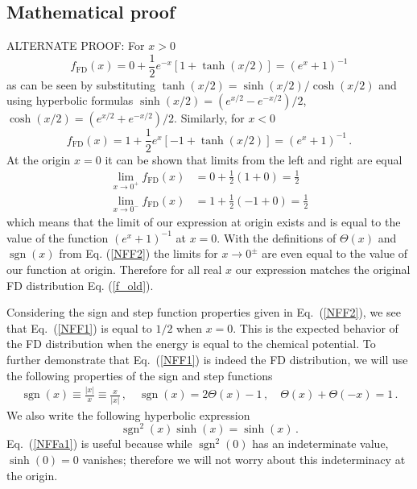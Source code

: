 \documentclass[sn-mathphys,Numbered]{sn-jnl}
\newcommand{\req}[1]{Eq.~(\ref{#1})}
\DeclareMathOperator{\sgn}{sgn}
\newcommand{\rev}[1]{{\color{blue}#1}}
\begin{document}
\subsection{Mathematical proof}
\label{Proof}
\rev{ALTERNATE PROOF:
For $x>0$
\begin{equation}
    f_\mathrm{FD}(x) = 0 + \frac{1}{2}e^{-x}[1+\tanh(x/2)] = (e^x + 1)^{-1}
\end{equation}
as can be seen by substituting $\tanh(x/2)=\sinh(x/2)/\cosh(x/2)$ and using hyperbolic formulas $\sinh(x/2)=(e^{x/2}-e^{-x/2})/2$, $\cosh(x/2) = (e^{x/2}+e^{-x/2})/2$. Similarly, for $x<0$
\begin{equation}
    f_\mathrm{FD}(x) = 1 + \frac{1}{2}e^{x}[-1 + \tanh(x/2)] = (e^x + 1)^{-1}\,.
\end{equation}
At the origin $x=0$ it can be shown that limits from the left and right are equal
\begin{align}
    \lim_{x\rightarrow 0^+} f_\mathrm{FD}(x) &= 0 + \frac{1}{2}(1 + 0) = \frac{1}{2}\\
    \lim_{x\rightarrow 0^-} f_\mathrm{FD}(x) &= 1 + \frac{1}{2}(-1 + 0) = \frac{1}{2}
\end{align}
which means that the limit of our expression at origin exists and is equal to the value of the function $(e^x+1)^{-1}$ at $x = 0$. With the definitions of $\Theta(x)$ and $\sgn(x)$ from Eq. (\ref{NFF2}) the limits for $x \rightarrow 0^\pm$ are even equal to the value of our function at origin. Therefore for all real $x$ our expression matches the original FD distribution Eq. (\ref{f_old}).  
}


Considering the sign and step function properties given in \req{NFF2}, we see that \req{NFF1} is equal to $1/2$ when $x=0$. This is the expected behavior of the FD distribution when the energy is equal to the chemical potential. To further demonstrate that \req{NFF1} is indeed the FD distribution, we will use the following properties of the sign and step functions
\begin{align}
\label{NFF2a}
\sgn(x)\equiv\frac{|x|}{x}\equiv\frac{x}{|x|}\,,\quad
\sgn(x)=2\Theta(x)-1\,,\quad
\Theta(x)+\Theta(-x)=1\,.
\end{align}
We also write the following hyperbolic expression
\begin{equation}
\label{NFFa1}
\sgn^{2}(x)\sinh(x)=\sinh(x)\,.
\end{equation}
\req{NFFa1} is useful because while $\sgn^{2}(0)$ has an indeterminate value, $\sinh(0)=0$ vanishes; therefore we will not worry about this indeterminacy at the origin.
\end{document}
